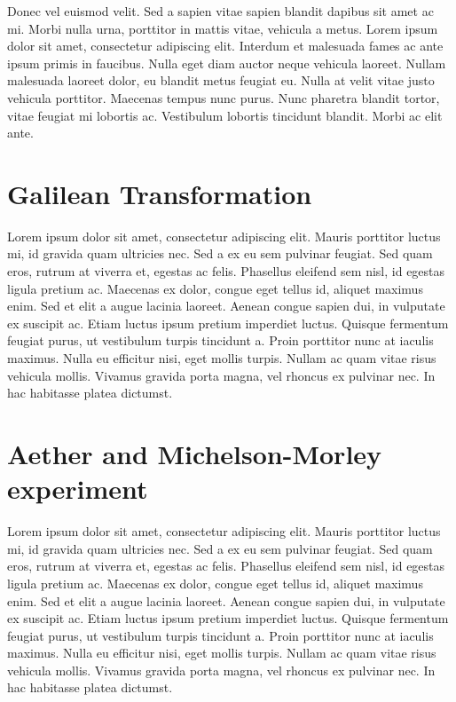 \documentclass[natbib]{muthesis}
\begin{document}
  Donec vel euismod velit. Sed a sapien vitae sapien blandit dapibus sit amet ac mi. Morbi nulla urna, porttitor in mattis vitae, vehicula a metus. Lorem ipsum dolor sit amet, consectetur adipiscing elit. Interdum et malesuada fames ac ante ipsum primis in faucibus. Nulla eget diam auctor neque vehicula laoreet. Nullam malesuada laoreet dolor, eu blandit metus feugiat eu. Nulla at velit vitae justo vehicula porttitor. Maecenas tempus nunc purus. Nunc pharetra blandit tortor, vitae feugiat mi lobortis ac. Vestibulum lobortis tincidunt blandit. Morbi ac elit ante.

  \section{Galilean Transformation}
  Lorem ipsum dolor sit amet, consectetur adipiscing elit. Mauris porttitor luctus mi, id gravida quam ultricies nec. Sed a ex eu sem pulvinar feugiat. Sed quam eros, rutrum at viverra et, egestas ac felis. Phasellus eleifend sem nisl, id egestas ligula pretium ac. Maecenas ex dolor, congue eget tellus id, aliquet maximus enim. Sed et elit a augue lacinia laoreet. Aenean congue sapien dui, in vulputate ex suscipit ac. Etiam luctus ipsum pretium imperdiet luctus. Quisque fermentum feugiat purus, ut vestibulum turpis tincidunt a. Proin porttitor nunc at iaculis maximus. Nulla eu efficitur nisi, eget mollis turpis. Nullam ac quam vitae risus vehicula mollis. Vivamus gravida porta magna, vel rhoncus ex pulvinar nec. In hac habitasse platea dictumst.


  \section{Aether and Michelson-Morley experiment}

  Lorem ipsum dolor sit amet, consectetur adipiscing elit. Mauris porttitor luctus mi, id gravida quam ultricies nec. Sed a ex eu sem pulvinar feugiat. Sed quam eros, rutrum at viverra et, egestas ac felis. Phasellus eleifend sem nisl, id egestas ligula pretium ac. Maecenas ex dolor, congue eget tellus id, aliquet maximus enim. Sed et elit a augue lacinia laoreet. Aenean congue sapien dui, in vulputate ex suscipit ac. Etiam luctus ipsum pretium imperdiet luctus. Quisque fermentum feugiat purus, ut vestibulum turpis tincidunt a. Proin porttitor nunc at iaculis maximus. Nulla eu efficitur nisi, eget mollis turpis. Nullam ac quam vitae risus vehicula mollis. Vivamus gravida porta magna, vel rhoncus ex pulvinar nec. In hac habitasse platea dictumst.
\end{document}
